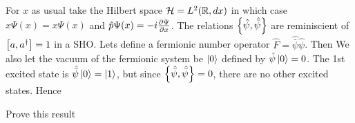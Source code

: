 \documentclass{article}
\begin{document}
For $x$ as usual take the Hilbert space $\mc{H} = L^2 ( \mbb{R}, dx)$ in which case $\hat{x} \Psi(x) = x\Psi(x)$ and $\hat{p} \Psi(x) = -i \pd[\Psi]{x}$. The relations $\acomm[\hat{\psi}]{\hat{\bar{\psi}}}$ are reminiscient of $\comm[a]{a^\dagger}=1$ in a SHO. Lets define a fermionic number operator $\hat{F} = \hat{\bar{\psi}}\hat{\psi}$. Then 
\eq{
\comm[\hat{F}]{\hat{\psi}} &= -\hat{\psi} \\
\comm[\hat{F}]{\hat{\bar{\psi}}} = \hat{\bar{\psi}}
}
We also let the vacuum of the fermionic system be $\ket{0}$ defined by $\hat{\psi}\ket{0}=0$. The 1st excited state is $\hat{\bar{\psi}}\ket{0} = \ket{1}$, but since $\acomm[\hat{\bar{\psi}}]{\hat{\bar{\psi}}}=0$, there are no other excited states. Hence 




\begin{ex}
Prove this result
\end{ex}
\end{document}
